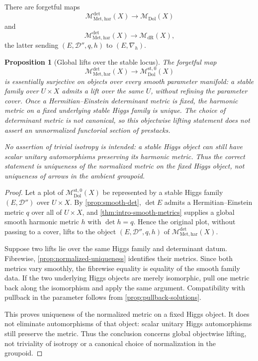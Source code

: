 \documentclass[11pt,reqno]{amsart}
\newtheorem{proposition}[theorem]{Proposition}
\theoremstyle{definition}
\theoremstyle{remark}
\newcommand{\cD}{\mathcal D}
\newcommand{\Dol}{\mathrm{Dol}}
\newcommand{\dR}{\mathrm{dR}}
\newcommand{\har}{\mathrm{har}}
\newcommand{\st}{\mathrm{st}}
\newcommand{\MdiffDol}{\mathscr M_{\Dol}}
\newcommand{\MdiffdR}{\mathscr M_{\dR}}
\newcommand{\MetHar}{\mathscr M_{\mathrm{Met},\har}}
\begin{document}
There are forgetful maps
\[
  \MetHar^{\det}(X)
  \longrightarrow
  \MdiffDol(X)
\]
and
\[
  \MetHar^{\det}(X)
  \longrightarrow
  \MdiffdR(X),
\]
the latter sending $(E,\cD'',q,h)$ to $(E,\nabla_h)$.

\begin{proposition}[Global lifts over the stable locus]\label{prop:metric-stack-section}
The forgetful map
\[
  \MetHar^{\det}(X)\to\MdiffDol^{\st,0}(X)
\]
is essentially surjective on objects over every smooth parameter manifold: a stable family over $U\times X$ admits a lift over the same $U$, without refining the parameter cover.  Once a Hermitian--Einstein determinant metric is fixed, the harmonic metric on a fixed underlying stable Higgs family is unique.  The choice of determinant metric is not canonical, so this objectwise lifting statement does not assert an unnormalized functorial section of prestacks.

No assertion of trivial isotropy is intended: a stable Higgs object can still have scalar unitary automorphisms preserving its harmonic metric.  Thus the correct statement is uniqueness of the normalized metric on the fixed Higgs object, not uniqueness of arrows in the ambient groupoid.
\end{proposition}

\begin{proof}
Let a plot of $\MdiffDol^{\st,0}(X)$ be represented by a stable Higgs family $(E,\cD'')$ over $U\times X$.  By \cref{prop:smooth-det}, $\det E$ admits a Hermitian--Einstein metric $q$ over all of $U\times X$, and \cref{thm:intro-smooth-metrics} supplies a global smooth harmonic metric $h$ with $\det h=q$.  Hence the original plot, without passing to a cover, lifts to the object $(E,\cD'',q,h)$ of $\MetHar^{\det}(X)$.

Suppose two lifts lie over the same Higgs family and determinant datum.  Fibrewise, \cref{prop:normalized-uniqueness} identifies their metrics.  Since both metrics vary smoothly, the fibrewise equality is equality of the smooth family data.  If the two underlying Higgs objects are merely isomorphic, pull one metric back along the isomorphism and apply the same argument.  Compatibility with pullback in the parameter follows from \cref{prop:pullback-solutions}.

This proves uniqueness of the normalized metric on a fixed Higgs object.  It does not eliminate automorphisms of that object: scalar unitary Higgs automorphisms still preserve the metric.  Thus the conclusion concerns global objectwise lifting, not triviality of isotropy or a canonical choice of normalization in the groupoid.
\end{proof}
\end{document}
